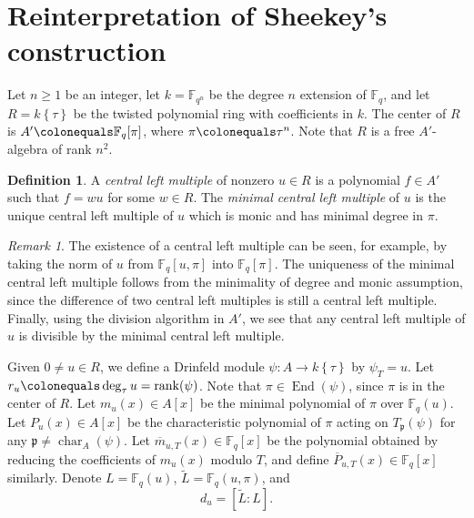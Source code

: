 \documentclass[12pt]{amsart}
\theoremstyle{definition}
\newtheorem{defn}[thm]{Definition}
\theoremstyle{remark}
\newtheorem{rem}[thm]{Remark}
\numberwithin{equation}{section}
\numberwithin{thm}{section}
\DeclareMathOperator{\End}{End}
\DeclareMathOperator{\rank}{rank}
\DeclareMathOperator{\chr}{char}
\newcommand{\fp}{\mathfrak{p}}
\newcommand{\F}{\mathbb{F}}
\newcommand{\twist}[1]{#1\!\left\{\tau\right\}}
\begin{document}
\section{Reinterpretation of Sheekey's construction}\label{secSheekey} Let $n\geq 1$ be an integer, let $k=\F_{q^n}$ be the degree 
$n$ extension of $\F_q$, and let $R=\twist{k}$ be the twisted polynomial ring with coefficients in $k$. 
The  center of $R$ is $A'\colonequals \F_q[\pi]$, where $\pi\colonequals \tau^n$. Note that $R$ is a free $A'$-algebra of rank $n^2$. 

\begin{defn} A \textit{central left multiple} of nonzero $u\in R$ is a polynomial $f\in A'$ such that $f=w u$ for some $w\in R$. 
	The \textit{minimal central left multiple} of $u$ is the unique central left multiple of $u$ which is monic and has minimal degree in $\pi$. 
\end{defn}

\begin{rem} The existence of a central left multiple can be seen, for example, by taking the norm of $u$ from $\F_q[u, \pi]$ into $\F_q[\pi]$. 
	The uniqueness of the minimal central left multiple follows from the minimality of degree and monic assumption, since the difference of two central left multiples is still a central left multiple.  Finally, using the division algorithm in $A'$, we see that any central left multiple of $u$ 
	is divisible by the minimal central left multiple. 
\end{rem}

Given $0\neq u\in R$, we define a Drinfeld module $\psi\colon A\to \twist{k}$ by $\psi_T=u$. Let $r_u\colonequals \deg_\tau u = \rank(\psi)$. 
Note that $\pi\in \End(\psi)$, since $\pi$ is in the center of $R$. 
Let $m_{u}(x)\in A[x]$ be the minimal polynomial of $\pi$ over $\F_q(u)$. 
Let $P_{u}(x)\in A[x]$ be the characteristic polynomial of $\pi$ acting on $T_\fp(\psi)$ for any $\fp\neq \chr_A(\psi)$. 
Let $\overline{m}_{u, T}(x)\in \F_q[x]$ be the polynomial obtained by reducing the coefficients of $m_{u}(x)$ modulo $T$, and 
define $\overline{P}_{u, T}(x)\in \F_q[x]$ similarly. Denote $L=\F_q(u)$, $\widetilde{L}=\F_q(u, \pi)$, and 
$$
d_u=[\widetilde{L}:L]. 
$$ 

\end{document}
